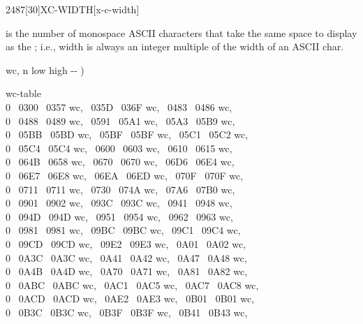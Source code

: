 \vspace*{-2ex}
\begin{worddef}{2487}[30]{XC-WIDTH}[x-c-width]%
\item {}

	 is the number of monospace ASCII characters that take the same
	space to display as the ; i.e.,  width is always
	an integer multiple of the width of an ASCII char.

	\begin{implement} %
	\word{:} wc,  n low high -{}- )   \word{,} \word{,} \word{,} \word{;}

	 wc-table   \\
	0 ~0300 ~0357 wc, ~035D ~036F wc, ~0483 ~0486 wc,\\
	0 ~0488 ~0489 wc, ~0591 ~05A1 wc, ~05A3 ~05B9 wc,\\
	0 ~05BB ~05BD wc, ~05BF ~05BF wc, ~05C1 ~05C2 wc,\\
	0 ~05C4 ~05C4 wc, ~0600 ~0603 wc, ~0610 ~0615 wc,\\
	0 ~064B ~0658 wc, ~0670 ~0670 wc, ~06D6 ~06E4 wc,\\
	0 ~06E7 ~06E8 wc, ~06EA ~06ED wc, ~070F ~070F wc,\\
	0 ~0711 ~0711 wc, ~0730 ~074A wc, ~07A6 ~07B0 wc,\\
	0 ~0901 ~0902 wc, ~093C ~093C wc, ~0941 ~0948 wc,\\
	0 ~094D ~094D wc, ~0951 ~0954 wc, ~0962 ~0963 wc,\\
	0 ~0981 ~0981 wc, ~09BC ~09BC wc, ~09C1 ~09C4 wc,\\
	0 ~09CD ~09CD wc, ~09E2 ~09E3 wc, ~0A01 ~0A02 wc,\\
	0 ~0A3C ~0A3C wc, ~0A41 ~0A42 wc, ~0A47 ~0A48 wc,\\
	0 ~0A4B ~0A4D wc, ~0A70 ~0A71 wc, ~0A81 ~0A82 wc,\\
	0 ~0ABC ~0ABC wc, ~0AC1 ~0AC5 wc, ~0AC7 ~0AC8 wc,\\
	0 ~0ACD ~0ACD wc, ~0AE2 ~0AE3 wc, ~0B01 ~0B01 wc,\\
	0 ~0B3C ~0B3C wc, ~0B3F ~0B3F wc, ~0B41 ~0B43 wc,\\

\end{implement}
\end{worddef}
